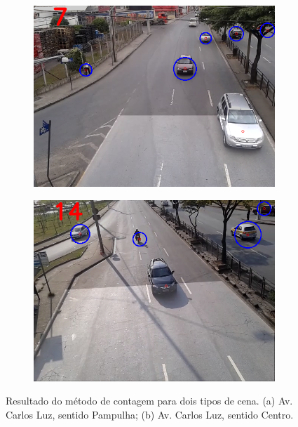 \begin{figure}[ht]
  \begin{center}
    \begin{subfigure}[b]{.49\textwidth}
      \begin{center}
        \includegraphics[width=1\linewidth]{imgs/trackers.png}
      \end{center}
      \caption{}
      \label{fig:sentido_pampulha}
    \end{subfigure}
    \begin{subfigure}[b]{.49\textwidth}
      \begin{center}
        \includegraphics[width=1\linewidth]{imgs/sentido_centro.png}
      \end{center}
      \caption{}
      \label{fig:sentido_centro}
    \end{subfigure}
  \end{center}
  \caption{Resultado do método de contagem para dois tipos de cena. (a) Av. Carlos Luz, sentido Pampulha; (b) Av. Carlos Luz, sentido Centro.}
  \label{fig:sentidos}
\end{figure}

